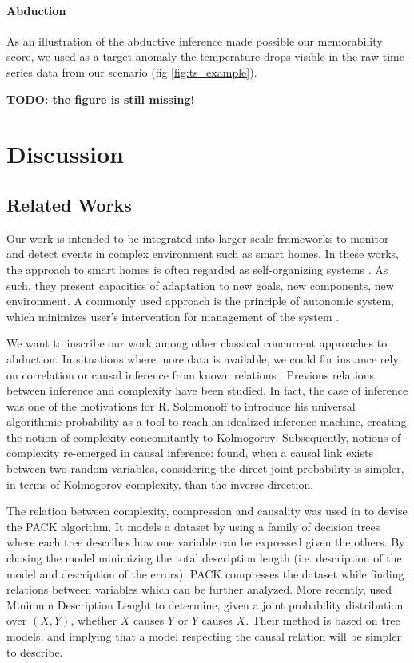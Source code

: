 \documentclass[entropy,article,submit,moreauthors,pdftex]{Definitions/mdpi}
\begin{document}
\paragraph{Abduction}
As an illustration of the abductive inference made possible our memorability
score, we used as a target anomaly the temperature drops visible in the raw
time series data from our scenario (fig \ref{fig:ts_example}).

\textbf{TODO: the figure is still missing!}



\section{Discussion}

\subsection{Related Works}
\label{sec:related}
Our work is intended to be integrated into larger-scale frameworks to monitor
and detect events in complex environment such as smart homes. In these works, the
approach to smart homes is often regarded as self-organizing systems \cite{kramer_rigorous_2009,kounev_notion_2017}. As such, they present capacities of adaptation to new goals,
new components, new environment. A commonly used approach is the principle of
autonomic system, which minimizes user's intervention for management of the
system \cite{kounev_notion_2017,kephart_vision_2003}.

We want to inscribe our work among other classical concurrent approaches to
abduction. In situations where more data is available, we could for instance rely
on correlation or causal inference from known relations \cite{peters_elements_2017,fadiga_or_2021}.
Previous relations between inference and complexity have been studied. In fact, the
case of inference was one of the motivations for R. Solomonoff to introduce his
universal algorithmic probability \cite{solomonoff_formal_1964} as a tool to
reach an idealized inference machine, creating the notion of complexity concomitantly
to Kolmogorov. Subsequently, notions of complexity re-emerged in causal inference:
\cite{janzing_causal_2010} found, when a causal link exists between two random variables,
considering the direct joint probability is simpler, in terms of Kolmogorov complexity,
than the inverse direction.

The relation between complexity, compression and causality was used in \cite{tatti_finding_2008} to devise the PACK algorithm. It models a dataset by using a family of decision trees where each tree describes how one variable can be expressed given the others. By chosing the model minimizing the total description length (i.e. description of the model and description of the errors), PACK compresses the dataset while finding relations between variables which can be further analyzed. More recently, \cite{marx_causal_2018} used Minimum Description Lenght to determine, given a joint probability distribution over $(X,Y)$, whether $X$ causes $Y$ or $Y$ causes $X$. Their method is based on tree models, and implying that a model respecting the causal relation will be simpler to describe.
\end{document}
